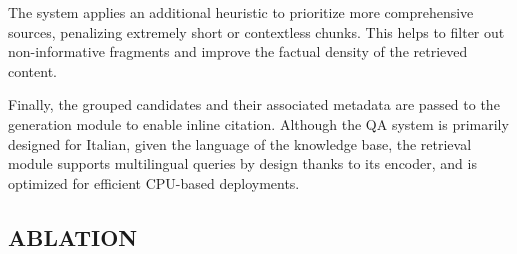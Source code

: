 \begin{spacing}{1.5}
The system applies an additional heuristic to prioritize more comprehensive sources, penalizing extremely short or contextless chunks. This helps to filter out non-informative fragments and improve the factual density of the retrieved content.

Finally, the grouped candidates and their associated metadata are passed to the generation module to enable inline citation. Although the QA system is primarily designed for Italian, given the language of the knowledge base, the retrieval module supports multilingual queries by design thanks to its encoder, and is optimized for efficient CPU-based deployments.

\subsection{ABLATION}\label{sec:retrieval_ablation}



\end{spacing}
